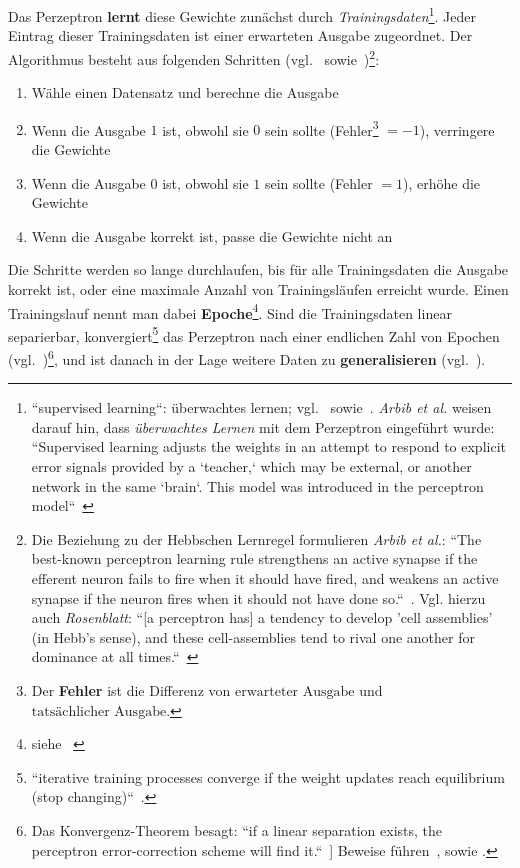 Das Perzeptron \textbf{lernt} diese Gewichte zunächst durch \textit{Trainingsdaten}\footnote{
    ``supervised learning``: überwachtes lernen; vgl.~\cite[811]{RN09} sowie~\cite[15]{Fau94}. \textit{Arbib et al.} weisen darauf hin, dass \textit{überwachtes Lernen} mit dem Perzeptron eingeführt wurde: ``Supervised learning adjusts the weights in an attempt to respond to explicit error signals provided by a `teacher,` which may be external, or another network in the same `brain`. This model was introduced in the perceptron model``~\cite[30]{Arb03}
}.
Jeder Eintrag dieser Trainingsdaten ist einer erwarteten Ausgabe zugeordnet. Der Algorithmus besteht aus folgenden Schritten (vgl.~\cite[65]{RM87} sowie~\cite[842]{RN09})\footnote{
    Die Beziehung zu der Hebbschen Lernregel formulieren \textit{Arbib et al.}:
        ``The best-known perceptron learning rule strengthens an active synapse if the efferent neuron fails to fire when it should have fired, and weakens an active synapse if the neuron fires when it should not have done so.``~\cite[20]{Arb03}.
        Vgl. hierzu auch \textit{Rosenblatt}: ``[a perceptron has] a tendency to develop 'cell assemblies' (in Hebb's sense), and these cell-assemblies tend to rival one another for dominance at all times.``~\cite[464]{Ros62}
}:



\begin{enumerate}
    \item Wähle einen Datensatz und berechne die Ausgabe
    \item Wenn die Ausgabe $1$ ist, obwohl sie $0$ sein sollte (Fehler\footnote{
    Der \textbf{Fehler} ist die Differenz von $\text{erwarteter Ausgabe}$ und $\text{tatsächlicher Ausgabe}$.
    } $=-1$), verringere die Gewichte
    \item Wenn die Ausgabe $0$ ist, obwohl sie $1$ sein sollte  (Fehler $=1$), erhöhe die Gewichte
    \item Wenn die Ausgabe korrekt ist, passe die Gewichte nicht an
\end{enumerate}

\noindent


\noindent
Die Schritte werden so lange durchlaufen, bis für alle Trainingsdaten die Ausgabe korrekt ist, oder eine maximale Anzahl von Trainingsläufen erreicht wurde.
Einen Trainingslauf nennt man dabei \textbf{Epoche}\footnote{siehe ~\cite[436]{Fau94}}.
Sind die Trainingsdaten linear separierbar, {konvergiert}\footnote{
    ``iterative training processes converge if the weight updates reach equilibrium (stop changing)``~\cite[425 ``Convergence``]{Fau94}.
} das Perzeptron nach einer endlichen Zahl von Epochen (vgl.~\cite[164]{MP88})\footnote{
    Das Konvergenz-Theorem besagt: ``if a linear separation exists, the perceptron error-correction scheme will find it.``~\cite[20]{Arb03}] Beweise führen~\cite[111 ff.]{Ros62}, \cite[168 ff.]{MP88} sowie \cite{Nov62}.
}, und ist danach in der Lage weitere Daten zu \textbf{generalisieren} (vgl.~\cite[202]{Ert21a}).\\

